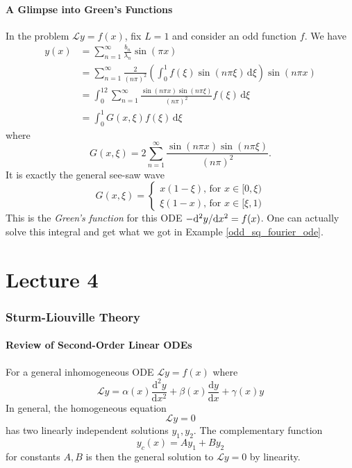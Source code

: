 \documentclass[a4paper]{article}
\begin{document}
\subsection{A Glimpse into Green's Functions}
In the problem $ \mathcal{L}y=f(x) $, fix $L=1$ and consider an odd function $f$.
We have
\begin{align}
    y(x)&=\sum_{n=1}^\infty\frac{b_n}{\lambda_n}\sin(\pi x)\nonumber\\
    &=\sum_{n=1}^\infty\frac{2}{(n\pi)^2}\left(\int_0^1f(\xi)\sin(n\pi\xi)\,\mathrm d\xi\right)\sin(n\pi x)\nonumber\\
    &=\int_0^12\sum_{n=1}^\infty\frac{\sin(n\pi x)\sin(n\pi\xi)}{(n\pi)^2}f(\xi)\,\mathrm d\xi\tag{Assume swapping limits}\\
    &=\int_0^1G(x,\xi)f(\xi)\,\mathrm d\xi
\end{align}
where
\begin{equation}
    G(x,\xi)=2\sum_{n=1}^\infty\frac{\sin(n\pi x)\sin(n\pi\xi)}{(n\pi)^2}.
\end{equation}
It is exactly the general see-saw wave
\begin{equation}
    G(x,\xi)=\begin{cases}
        x(1-\xi)\text{, for $x\in[0,\xi)$}\\
        \xi(1-x)\text{, for $x\in[\xi,1)$}
    \end{cases}
\end{equation}
This is the \textit{Green's function} for this ODE $-\mathrm{d}^2 y/\mathrm{d} x^2 =f(x)$.
One can actually solve this integral and get what we got in Example \ref{odd_sq_fourier_ode}.
\newpage
\part*{Lecture 4}
\section{Sturm-Liouville Theory}
\subsection{Review of Second-Order Linear ODEs}
For a general inhomogeneous ODE $\mathcal Ly=f(x)$ where
\begin{equation}
    \mathcal Ly=\alpha(x)\frac{\mathrm d^2y}{\mathrm dx^2}+\beta(x)\frac{\mathrm dy}{\mathrm dx}+\gamma(x)y
\end{equation}
In general, the homogeneous equation
\begin{equation}
    \mathcal Ly=0
\end{equation}
has two linearly independent solutions $y_1,y_2$.
The complementary function
\begin{equation}
    y_c(x)=Ay_1+By_2
\end{equation}
for constants $A,B$ is then the general solution to $\mathcal Ly=0$ by linearity.
\end{document}
